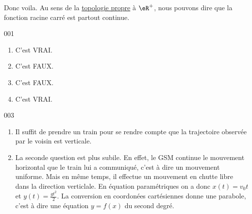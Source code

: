 \documentclass{article}
\begin{document}
Donc voila. Au sens de la \href{http://fr.wikipedia.org/wiki/Topologie_induite}{topologie propre} à $\eR^+$, nous pouvons dire que la fonction racine carré est partout continue.
\begin{corrige}{001}
\begin{enumerate}
\item C'est VRAI.
\item C'est FAUX.
\item C'est FAUX.
\item C'est VRAI.
\end{enumerate}
\end{corrige}


\begin{corrige}{003}
\begin{enumerate}
\item Il suffit de prendre un train pour se rendre compte que la trajectoire observée par le voisin est verticale.
\item La seconde question est plus subile. En effet, le GSM continue le mouvement horizontal que le train lui a communiqué, c'est à dire un mouvement uniforme. Mais en même temps, il effectue un mouvement en chutte libre dans la direction verticlale. En équation paramétriques on a donc $x(t)=v_0t$ et $y(t)=\frac{gt^2}{2}$. La conversion en coordonées cartésiennes donne une parabole, c'est à dire une équation $y=f(x)$ du second degré.
\end{enumerate}
\end{corrige}


\end{document}
